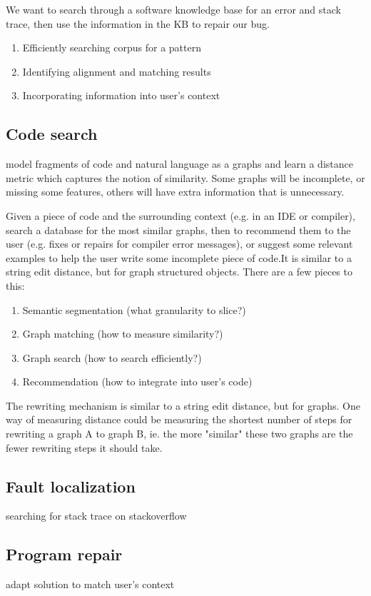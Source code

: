 \documentclass[11pt]{article}
\begin{document}
    We want to search through a software knowledge base for an error and stack trace, then use the information in the KB to repair our bug.

    \begin{enumerate}
        \item Efficiently searching corpus for a pattern
        \item Identifying alignment and matching results
        \item Incorporating information into user's context
    \end{enumerate}

    \subsection{Code search}

    model fragments of code and natural language as a graphs and learn a distance metric which captures the notion of similarity. Some graphs will be incomplete, or missing some features, others will have extra information that is unnecessary.

    Given a piece of code and the surrounding context (e.g. in an IDE or compiler), search a database for the most similar graphs, then to recommend them to the user (e.g. fixes or repairs for compiler error messages), or suggest some relevant examples to help the user write some incomplete piece of code.It is similar to a string edit distance, but for graph structured objects. There are a few pieces to this:

    \begin{enumerate}
    \item Semantic segmentation (what granularity to slice?)
    \item Graph matching (how to measure similarity?)
    \item Graph search (how to search efficiently?)
    \item Recommendation (how to integrate into user's code)
    \end{enumerate}

    The rewriting mechanism is similar to a string edit distance, but for graphs. One way of measuring distance could be measuring the shortest number of steps for rewriting a graph A to graph B, ie. the more "similar" these two graphs are the fewer rewriting steps it should take.

    \subsection{Fault localization}

    searching for stack trace on stackoverflow

    \subsection{Program repair}

    adapt solution to match user's context

    \pagebreak
    
    
\end{document}
